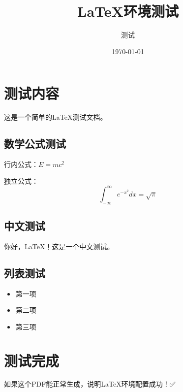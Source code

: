 \documentclass{article}
\title{LaTeX环境测试}
\author{测试}
\date{\today}
\begin{document}
\maketitle

\section{测试内容}

这是一个简单的LaTeX测试文档。

\subsection{数学公式测试}

行内公式：$E = mc^2$

独立公式：
\begin{equation}
\int_{-\infty}^{\infty} e^{-x^2} dx = \sqrt{\pi}
\end{equation}

\subsection{中文测试}

你好，LaTeX！这是一个中文测试。

\subsection{列表测试}

\begin{itemize}
    \item 第一项
    \item 第二项
    \item 第三项
\end{itemize}

\section{测试完成}

如果这个PDF能正常生成，说明LaTeX环境配置成功！✅
\end{document}
